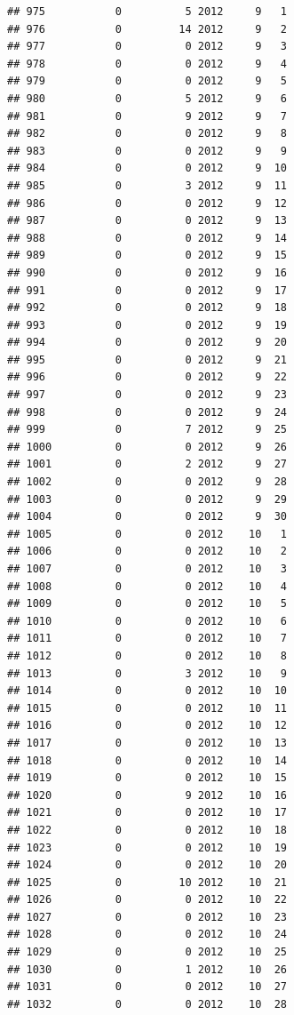 \documentclass[
]{article}
\begin{document}
\begin{verbatim}
## 975           0          5 2012     9   1
## 976           0         14 2012     9   2
## 977           0          0 2012     9   3
## 978           0          0 2012     9   4
## 979           0          0 2012     9   5
## 980           0          5 2012     9   6
## 981           0          9 2012     9   7
## 982           0          0 2012     9   8
## 983           0          0 2012     9   9
## 984           0          0 2012     9  10
## 985           0          3 2012     9  11
## 986           0          0 2012     9  12
## 987           0          0 2012     9  13
## 988           0          0 2012     9  14
## 989           0          0 2012     9  15
## 990           0          0 2012     9  16
## 991           0          0 2012     9  17
## 992           0          0 2012     9  18
## 993           0          0 2012     9  19
## 994           0          0 2012     9  20
## 995           0          0 2012     9  21
## 996           0          0 2012     9  22
## 997           0          0 2012     9  23
## 998           0          0 2012     9  24
## 999           0          7 2012     9  25
## 1000          0          0 2012     9  26
## 1001          0          2 2012     9  27
## 1002          0          0 2012     9  28
## 1003          0          0 2012     9  29
## 1004          0          0 2012     9  30
## 1005          0          0 2012    10   1
## 1006          0          0 2012    10   2
## 1007          0          0 2012    10   3
## 1008          0          0 2012    10   4
## 1009          0          0 2012    10   5
## 1010          0          0 2012    10   6
## 1011          0          0 2012    10   7
## 1012          0          0 2012    10   8
## 1013          0          3 2012    10   9
## 1014          0          0 2012    10  10
## 1015          0          0 2012    10  11
## 1016          0          0 2012    10  12
## 1017          0          0 2012    10  13
## 1018          0          0 2012    10  14
## 1019          0          0 2012    10  15
## 1020          0          9 2012    10  16
## 1021          0          0 2012    10  17
## 1022          0          0 2012    10  18
## 1023          0          0 2012    10  19
## 1024          0          0 2012    10  20
## 1025          0         10 2012    10  21
## 1026          0          0 2012    10  22
## 1027          0          0 2012    10  23
## 1028          0          0 2012    10  24
## 1029          0          0 2012    10  25
## 1030          0          1 2012    10  26
## 1031          0          0 2012    10  27
## 1032          0          0 2012    10  28

\end{verbatim}
\end{document}
